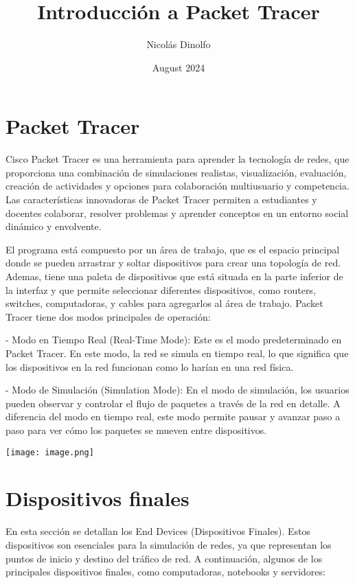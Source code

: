 \documentclass{article}
\title{Introducción a Packet Tracer}
\author{Nicolás Dinolfo}
\date{August 2024}
\begin{document}
\maketitle

\section{Packet Tracer}
Cisco Packet Tracer es una herramienta para aprender la tecnología de redes, que proporciona una combinación de simulaciones realistas, visualización, evaluación, creación de actividades y opciones para colaboración multiusuario y competencia. Las características innovadoras de Packet Tracer permiten a estudiantes y docentes colaborar, resolver problemas y aprender conceptos en un entorno social dinámico y envolvente. 

El programa está compuesto por un área de trabajo, que es el espacio principal donde se pueden arrastrar y soltar dispositivos para crear una topología de red. Ademas, tiene una paleta de dispositivos que está situada en la parte inferior de la interfaz y que permite seleccionar diferentes dispositivos, como routers, switches, computadoras, y cables para agregarlos al área de trabajo. Packet Tracer tiene dos modos principales de operación:

- Modo en Tiempo Real (Real-Time Mode): Este es el modo predeterminado en Packet Tracer. En este modo, la red se simula en tiempo real, lo que significa que los dispositivos en la red funcionan como lo harían en una red física.

- Modo de Simulación (Simulation Mode): En el modo de simulación, los usuarios pueden observar y controlar el flujo de paquetes a través de la red en detalle. A diferencia del modo en tiempo real, este modo permite pausar y avanzar paso a paso para ver cómo los paquetes se mueven entre dispositivos.

\begin{center}
    \texttt{[image: image.png]}
\end{center}

\section{Dispositivos finales}
En esta sección se detallan los End Devices (Dispositivos Finales). Estos dispositivos son esenciales para la simulación de redes, ya que representan los puntos de inicio y destino del tráfico de red. A continuación, algunos de los principales dispositivos finales, como computadoras, notebooks y servidores:
\end{document}
